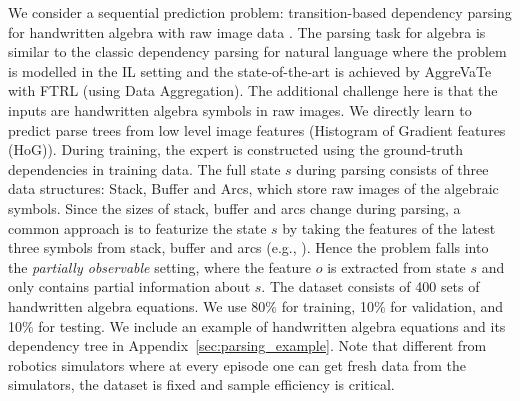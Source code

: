 \documentclass{article}
\begin{document}
We consider a sequential prediction problem: transition-based dependency parsing for handwritten algebra with raw image data \cite{duyckpredicting}. The parsing task for algebra is similar to the classic dependency parsing for natural language \cite{chang2015learning_dependency} where the problem is modelled in the IL setting and the state-of-the-art is achieved by AggreVaTe with FTRL (using Data Aggregation). The additional challenge here is that the inputs are handwritten algebra symbols in raw images. We directly learn to predict parse trees from low level image features (Histogram of Gradient features (HoG)). During training, the expert is constructed using the ground-truth dependencies in training data. %
The full state $s$ during parsing consists of three data structures: Stack, Buffer and Arcs, which store raw images of the algebraic symbols. Since the sizes of stack, buffer and arcs change during parsing, a common approach is to featurize the state $s$ by taking the features of the latest three symbols from stack, buffer and arcs (e.g., \cite{chang2015learning_dependency}). Hence the problem falls into the \emph{partially observable} setting, where the feature $o$ is extracted from state $s$ and only contains partial information about $s$. %
The dataset consists of 400 sets of handwritten algebra equations. We use 80$\%$ for training, 10$\%$ for validation, and 10$\%$ for testing. We include an example of handwritten algebra equations and its dependency tree in Appendix~\ref{sec:parsing_example}. Note that different from robotics simulators where at every episode one can get fresh data from the simulators, the dataset is fixed and sample efficiency is critical. 
\end{document}
